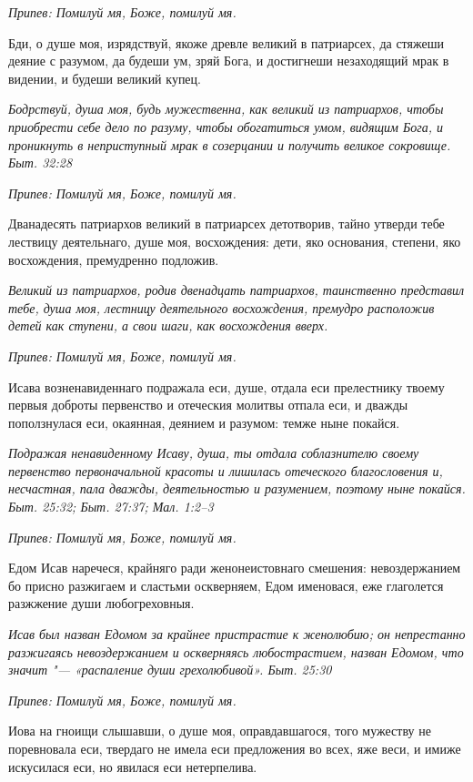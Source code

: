 \itshape Припев:\normalfont{} Помилуй мя, Боже, помилуй мя.


Бди, о душе моя, изрядствуй, якоже древле великий в патриарсех, да стяжеши деяние с разумом, да будеши ум, зряй Бога, и достигнеши незаходящий мрак в видении, и будеши великий купец.


\itshape Бодрствуй, душа моя, будь мужественна, как великий из патриархов, чтобы приобрести себе дело по разуму, чтобы обогатиться умом, видящим Бога, и проникнуть в неприступный мрак в созерцании и получить великое сокровище. Быт. 32:28\normalfont{}


\itshape Припев:\normalfont{} Помилуй мя, Боже, помилуй мя.


Дванадесять патриархов великий в патриарсех детотворив, тайно утверди тебе лествицу деятельнаго, душе моя, восхождения: дети, яко основания, степени, яко восхождения, премудренно подложив.


\itshape Великий из патриархов, родив двенадцать патриархов, таинственно представил тебе, душа моя, лестницу деятельного восхождения, премудро расположив детей как ступени, а свои шаги, как восхождения вверх.\normalfont{}


\itshape Припев:\normalfont{} Помилуй мя, Боже, помилуй мя.


Исава возненавиденнаго подражала еси, душе, отдала еси прелестнику твоему первыя доброты первенство и отеческия молитвы отпала еси, и дважды поползнулася еси, окаянная, деянием и разумом: темже ныне покайся.


\itshape Подражая ненавиденному Исаву, душа, ты отдала соблазнителю своему первенство первоначальной красоты и лишилась отеческого благословения и, несчастная, пала дважды, деятельностью и разумением, поэтому ныне покайся. Быт. 25:32; Быт. 27:37; Мал. 1:2–3\normalfont{}


\itshape Припев:\normalfont{} Помилуй мя, Боже, помилуй мя.


Едом Исав наречеся, крайняго ради женонеистовнаго смешения: невоздержанием бо присно разжигаем и сластьми оскверняем, Едом именовася, еже глаголется разжжение души любогреховныя.


\itshape Исав был назван Едомом за крайнее пристрастие к женолюбию; он непрестанно разжигаясь невоздержанием и оскверняясь любострастием, назван Едомом, что значит "--- «распаление души грехолюбивой». Быт. 25:30\normalfont{}


\itshape Припев:\normalfont{} Помилуй мя, Боже, помилуй мя.


Иова на гноищи слышавши, о душе моя, оправдавшагося, того мужеству не поревновала еси, твердаго не имела еси предложения во всех, яже веси, и имиже искусилася еси, но явилася еси нетерпелива.



